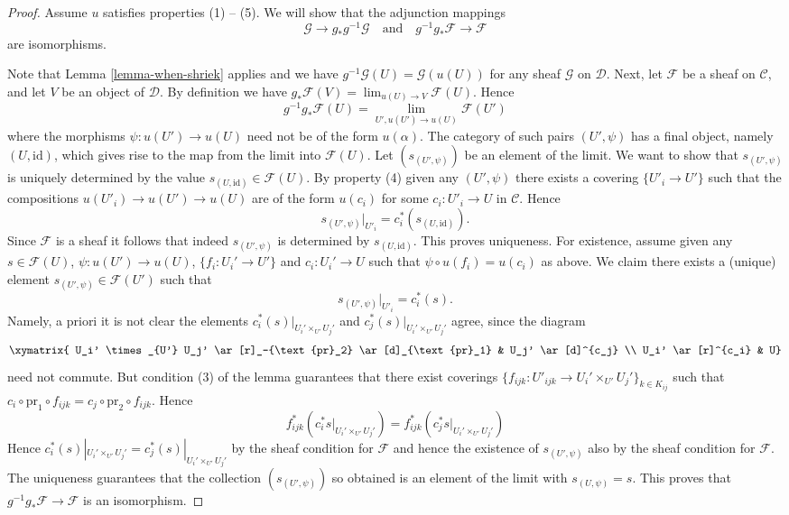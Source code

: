 \begin{proof}
Assume $u$ satisfies properties (1) -- (5). We will show that
the adjunction mappings
$$
\mathcal{G} \longrightarrow g_*g^{-1}\mathcal{G}
\quad\text{and}\quad
g^{-1}g_*\mathcal{F} \longrightarrow \mathcal{F}
$$
are isomorphisms.

\medskip\noindent
Note that Lemma \ref{lemma-when-shriek} applies and we have
$g^{-1}\mathcal{G}(U) = \mathcal{G}(u(U))$ for any sheaf $\mathcal{G}$
on $\mathcal{D}$. Next, let $\mathcal{F}$ be a sheaf on $\mathcal{C}$,
and let $V$ be an object of $\mathcal{D}$. By definition we have
$g_*\mathcal{F}(V) = \lim_{u(U) \to V} \mathcal{F}(U)$.
Hence
$$
g^{-1}g_*\mathcal{F}(U) = \lim_{U', u(U') \to u(U)} \mathcal{F}(U')
$$
where the morphisms $\psi : u(U') \to u(U)$ need not be of the form
$u(\alpha)$. The category of such pairs $(U', \psi)$ has a final
object, namely $(U, \text{id})$, which gives rise to the map from
the limit into $\mathcal{F}(U)$. Let $(s_{(U', \psi)})$ be an element
of the limit. We want to show that $s_{(U', \psi)}$ is uniquely determined
by the value $s_{(U, \text{id})} \in \mathcal{F}(U)$. By property (4) given
any $(U', \psi)$ there exists a covering $\{U'_i \to U'\}$ such that the
compositions $u(U'_i) \to u(U') \to u(U)$ are of the form $u(c_i)$
for some $c_i : U'_i \to U$ in $\mathcal{C}$. Hence
$$
s_{(U', \psi)}|_{U'_i} = c_i^*(s_{(U, \text{id})}).
$$
Since $\mathcal{F}$ is a sheaf it follows that indeed $s_{(U', \psi)}$
is determined by $s_{(U, \text{id})}$. This proves uniqueness.
For existence, assume given any
$s \in \mathcal{F}(U)$, $\psi : u(U') \to u(U)$, $\{f_i : U_i' \to U'\}$
and $c_i : U_i' \to U$ such that $\psi \circ u(f_i) = u(c_i)$ as above.
We claim there exists a (unique) element
$s_{(U', \psi)} \in \mathcal{F}(U')$ such that
$$
s_{(U', \psi)}|_{U'_i} = c_i^*(s).
$$
Namely, a priori it is not clear the elements
$c_i^*(s)|_{U_i' \times_{U'} U_j'}$
and $c_j^*(s)|_{U_i' \times_{U'} U_j'}$ agree, since
the diagram
$$
\xymatrix{
U_i' \times_{U'} U_j' \ar[r]_-{\text{pr}_2} \ar[d]_{\text{pr}_1} &
U_j' \ar[d]^{c_j} \\
U_i' \ar[r]^{c_i} & U}
$$
need not commute. But condition (3) of the lemma guarantees that there
exist coverings
$\{f_{ijk} : U'_{ijk} \to U_i' \times_{U'} U_j'\}_{k \in K_{ij}}$ such that
$c_i \circ \text{pr}_1 \circ f_{ijk} = c_j \circ \text{pr}_2 \circ f_{ijk}$.
Hence
$$
f_{ijk}^* \left(c_i^*s|_{U_i' \times_{U'} U_j'}\right)
=
f_{ijk}^* \left(c_j^*s|_{U_i' \times_{U'} U_j'}\right)
$$
Hence $c_i^*(s)|_{U_i' \times_{U'} U_j'} = c_j^*(s)|_{U_i' \times_{U'} U_j'}$
by the sheaf condition for $\mathcal{F}$ and hence the existence of
$s_{(U', \psi)}$ also by the sheaf condition for $\mathcal{F}$. The uniqueness
guarantees that the collection $(s_{(U', \psi)})$ so obtained is an element
of the limit with $s_{(U, \psi)} = s$. This proves
that $g^{-1}g_*\mathcal{F} \to \mathcal{F}$ is an isomorphism.


\end{proof}
